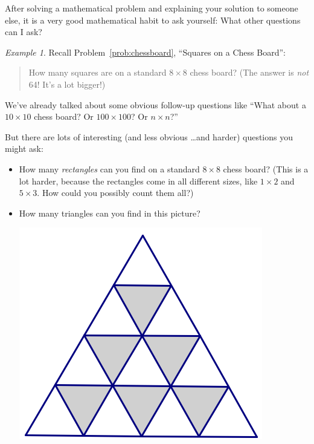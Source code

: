 \documentclass[10pt, reqno]{amsart}
\theoremstyle{remark}
\newtheorem{example}[thm]{Example}
\theoremstyle{definition}
\numberwithin{equation}{section}  %
\begin{document}
After solving a mathematical problem and explaining your solution to someone else, it is a very good mathematical habit to ask yourself: What other questions can I ask?

\begin{example}
Recall Problem~\ref{prob:chessboard}, ``Squares on a Chess Board'':

\begin{quote}
How many squares are on a standard $8 \times 8$ chess board?  (The answer is \emph{not} 64!  It's a lot bigger!)
\end{quote}

We've already talked about some obvious follow-up questions like ``What about a $10 \times 10$ chess board?  Or $100 \times 100$?  Or $n \times n$?''

But there are lots of interesting (and less obvious \dots and harder) questions you might ask:
\begin{itemize}
\item
How many \emph{rectangles} can you find on a standard $8 \times 8$ chess board?  (This is a lot harder, because the rectangles come in all different sizes, like $1 \times 2$ and $5 \times 3$.  How could you possibly count them all?)
\item
How many triangles can you find in this picture?
\begin{center}
\includegraphics[height=4 cm]{triangleboard}
\end{center}

\end{itemize}

\end{example}
\end{document}
